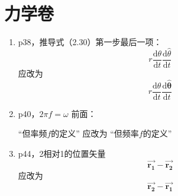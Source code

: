 \documentclass[a4paper,12pt,UTF8]{ctexart}
\begin{document}
\section{力学卷}
\begin{enumerate}
    \item 
    p38，推导式（2.30）第一步最后一项：
    \[
        r\frac{\mathrm{d}\theta}{\mathrm{d}t}\frac{\mathrm{d}\hat{\theta}}{\mathrm{d}t}
    \]
    \textcolor[rgb]{1,0,0}{应改为}
    \[
        r\frac{\mathrm{d}\theta}{\mathrm{d}t}\frac{\mathrm{d}\hat{\bm{\theta}}}{\mathrm{d}t}
        \]
    \item 
    p40，$2\pi f=\omega$ 前面：\par
    “但率频$f$的定义”
    \textcolor[rgb]{1,0,0}{应改为}
    “但频率$f$的定义”
    \item 
    p44，2相对1的位置矢量
    \[
        \vec{\bm{r_1}}-\vec{\bm{r_2}}
    \]
    \textcolor[rgb]{1,0,0}{应改为}
    \[
        \vec{\bm{r_2}}-\vec{\bm{r_1}}
    \]


\end{enumerate}
\end{document}
